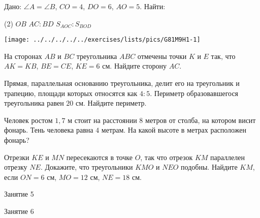 \begin{homework}[number=2]
	\begin{listofex}
		\item 
		\begin{minipage}[t]{\bodywidth}
			Дано: \( \angle A = \angle B \), \( CO = 4 \), \( DO = 6 \), \( AO = 5  \). Найти:\begin{tasks}(2)
				\task \( OB \)
				\task \( AC : BD \) 
				\task \( S_{AOC} : S_{BOD} \)
			\end{tasks}
		\end{minipage}
		\hspace{0.02\linewidth}
		\begin{minipage}[t]{\picwidth}
			\texttt{[image: ../../../../../exercises/lists/pics/G81M9H1-1]}
		\end{minipage}
		\item На сторонах \( AB \) и \( BC \) треугольника \( ABC \) отмечены точки \( K \) и \( E \) так, что \( AK=KB \), \( BE=CE \), \( KE=6 \) см. Найдите сторону \( AC \).
		\item  Прямая, параллельная основанию треугольника, делит его на треугольник и трапецию, площади которых относятся как \( 4:5 \). Периметр образовавшегося треугольника равен \( 20 \) см. Найдите периметр.
		\item Человек ростом \( 1,7 \) м стоит на расстоянии \( 8 \) метров от столба, на котором висит фонарь. Тень человека равна \( 4 \) метрам. На какой высоте в метрах расположен фонарь?
		\item Отрезки \( KE \) и \( MN \) пересекаются в точке \( O \), так что отрезок \( KM \) параллелен отрезку \( NE \). Докажите, что треугольники \( KMO \) и \( NEO \) подобны. Найдите \( KM \), если \( ON=6 \) см, \( MO=12 \) см, \( NE=18 \) см.
	\end{listofex}
\end{homework}

\begin{class}[number=5]
	\begin{listofex}
		\item Занятие 5
	\end{listofex}
\end{class}

\begin{class}[number=6]
	\begin{listofex}
		\item Занятие 6
	\end{listofex}
\end{class}

